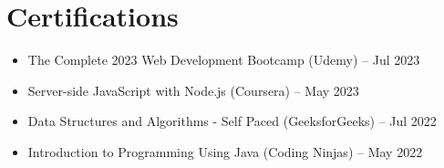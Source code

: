 \documentclass[letterpaper,11pt]{article}
\begin{document}
\section{Certifications}
\begin{itemize}[leftmargin=0.15in, label={}]
    \item The Complete 2023 Web Development Bootcamp (Udemy) -- Jul 2023 
    \item Server-side JavaScript with Node.js (Coursera) -- May 2023
    \item Data Structures and Algorithms - Self Paced (GeeksforGeeks) -- Jul 2022
    \item Introduction to Programming Using Java (Coding Ninjas) -- May 2022
\end{itemize}
\end{document}

